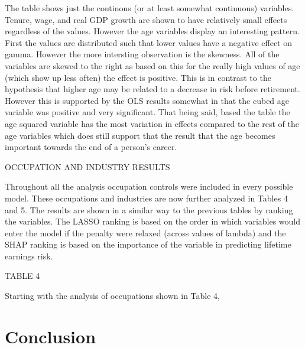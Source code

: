 \documentclass[12pt]{article}
\begin{document}
\begin{onehalfspace}
The table shows just the continous (or at least somewhat continuous) variables. Tenure, wage, and real GDP growth are shown to have relatively small effects regardless of the values. However the age variables display an interesting pattern. First the values are distributed such that lower values have a negative effect on gamma. However the more intersting observation is the skewness. All of the variables are skewed to the right as based on this for the really high values of age (which show up less often) the effect is positive. This is in contrast to the hypothesis that higher age may be related to a decrease in risk before retirement. However this is supported by the OLS results somewhat in that the cubed age variable was positive and very significant. That being said, based the table the age squared variable has the most variation in effects compared to the rest of the age variables which does still support that the result that the age becomes important towards the end of a person's career.



OCCUPATION AND INDUSTRY RESULTS


Throughout all the analysis occupation controls were included in every possible model. These occupations and industries are now further analyzed in Tables 4 and 5. The results are shown in a similar way to the previous tables by ranking the variables. The LASSO ranking is based on the order in which variables would enter the model if the penalty were relaxed (across values of lambda) and the SHAP ranking is based on the importance of the variable in predicting lifetime earnings risk.


TABLE 4

Starting with the analysis of occupations shown in Table 4, 





\section{Conclusion}


\end{onehalfspace}

















\vspace{4cm}
\end{document}
